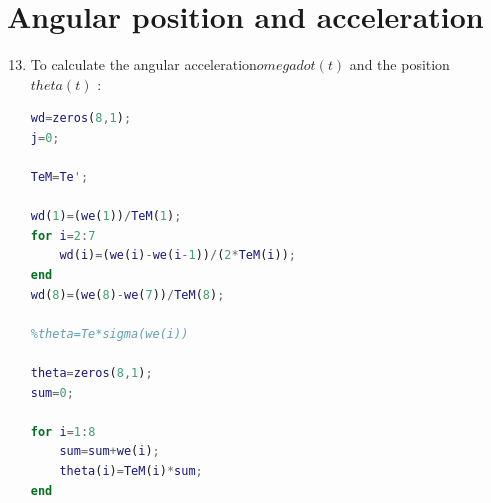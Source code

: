 \documentclass[a4paper,12pt]{article}
\begin{document}
\newpage
\section{Angular position and acceleration}

\begin{enumerate}[label={\color{blue}\arabic*)}]
    \setcounter{enumi}{12}

    \item
    To calculate the angular acceleration\(omega dot(t)\) and the position \(theta(t)\) :
     \begin{lstlisting}[style=Matlab-editor,language=Matlab, basicstyle=\small\ttfamily]
wd=zeros(8,1);
j=0;

TeM=Te';

wd(1)=(we(1))/TeM(1);
for i=2:7
    wd(i)=(we(i)-we(i-1))/(2*TeM(i));
end
wd(8)=(we(8)-we(7))/TeM(8);

%theta=Te*sigma(we(i))

theta=zeros(8,1);
sum=0;

for i=1:8
    sum=sum+we(i);
    theta(i)=TeM(i)*sum;
end
        \end{lstlisting}


\end{enumerate}
\end{document}
